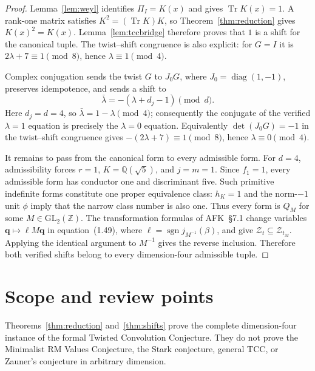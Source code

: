 \documentclass[11pt]{article}
\newcommand{\Tr}{\operatorname{Tr}}
\newcommand{\Q}{\mathbb Q}
\newcommand{\Z}{\mathbb Z}
\begin{document}
\begin{proof}
Lemma~\ref{lem:weyl} identifies $\Pi_I=K(x)$ and gives
$\Tr K(x)=1$.  A rank-one
matrix satisfies $K^2=(\Tr K)K$, so
Theorem~\ref{thm:reduction} gives $K(x)^2=K(x)$.
Lemma~\ref{lem:tccbridge} therefore proves that $1$ is a shift for the
canonical tuple.  The twist--shift congruence is also explicit:
for $G=I$ it is
$2\lambda+7\equiv1\pmod8$, hence $\lambda\equiv1\pmod4$.

Complex conjugation sends the twist $G$ to $J_0G$, where
$J_0=\operatorname{diag}(1,-1)$, preserves idempotence, and sends a shift
to
\[
\bar\lambda=-(\lambda+d_j-1)\pmod d.
\]
Here $d_j=d=4$, so $\bar\lambda=1-\lambda\pmod4$; consequently the
conjugate of the verified $\lambda=1$ equation is precisely the
$\lambda=0$ equation.  Equivalently $\det(J_0G)=-1$ in the
twist--shift congruence gives
$-(2\lambda+7)\equiv1\pmod8$, hence $\lambda\equiv0\pmod4$.

It remains to pass from the canonical form to every admissible form.
For $d=4$, admissibility forces $r=1$, $K=\Q(\sqrt5)$, and $j=m=1$.
Since $f_1=1$, every admissible form has conductor one and discriminant
five.  Such primitive indefinite forms constitute one proper
equivalence class: $h_K=1$ and the norm-$-1$ unit $\phi$ imply that
the narrow class number is also one.  Thus every form is $Q_M$ for
some $M\in\mathrm{GL}_2(\Z)$.  The transformation formulas of
AFK~\S7.1 change variables
$\boldsymbol q\mapsto\ell M\boldsymbol q$ in equation~(1.49), where
$\ell=\operatorname{sgn}j_{M^{-1}}(\beta)$, and give
$\mathcal Z_t\subseteq\mathcal Z_{t_M}$.  Applying the identical
argument to $M^{-1}$ gives the reverse inclusion.  Therefore both
verified shifts belong to every dimension-four admissible tuple.
\end{proof}

\section{Scope and review points}

Theorems~\ref{thm:reduction} and~\ref{thm:shifts} prove the complete
dimension-four instance of the formal Twisted Convolution Conjecture.
They do not prove the Minimalist RM Values Conjecture, the Stark
conjecture, general TCC, or Zauner's conjecture in arbitrary dimension.
\end{document}
